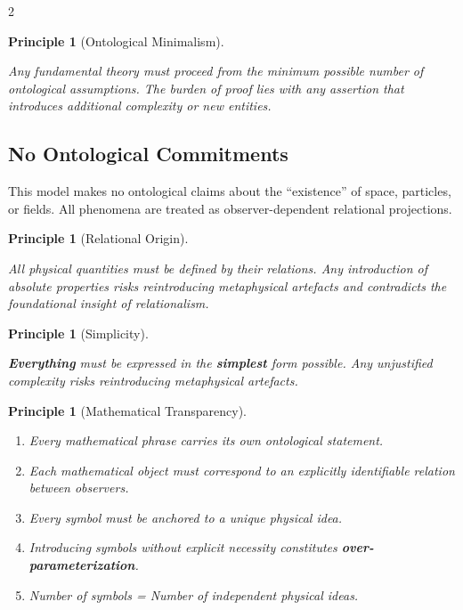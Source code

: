 \documentclass[10pt, a4paper]{article}
\newtheorem{principle}[theorem]{Principle}
\begin{document}
\begin{multicols}{2}
\begin{principle}[Ontological Minimalism]
\hypertarget{pr:minimalism}{}\label{pr:minimalism}
Any fundamental theory must proceed from the minimum possible number of ontological assumptions. The burden of proof lies with any assertion that introduces additional complexity or new entities.
\end{principle}

\subsection*{No Ontological Commitments}
This model makes no ontological claims about the ``existence'' of space, particles, or fields. All phenomena are treated as observer-dependent relational projections.

\begin{principle}[Relational Origin]
\hypertarget{pr:relational}{}\label{pr:relational}
\emph{All physical quantities must be defined by their relations.} Any introduction of absolute properties risks reintroducing metaphysical artefacts and contradicts the foundational insight of relationalism.
\end{principle}

\begin{principle}[Simplicity]
\hypertarget{pr:simplicity}{}\label{pr:simplicity }
\emph{\textbf{Everything} must be expressed in the \textbf{simplest} form possible.} Any unjustified complexity risks reintroducing metaphysical artefacts.
\end{principle}

\begin{principle}[Mathematical Transparency]
\hypertarget{pr:Mathematical}{}\label{pr:Mathematical}
\begin{enumerate}[nosep]
    \item Every mathematical phrase carries its own ontological statement.
    \item Each mathematical object must correspond to an explicitly identifiable relation between observers.
    \item Every symbol must be anchored to a unique physical idea.
    \item Introducing symbols without explicit necessity constitutes \textbf{over-parameterization}.
    \item Number of symbols = Number of independent physical ideas.
\end{enumerate}
\end{principle}



\end{multicols}
\end{document}
